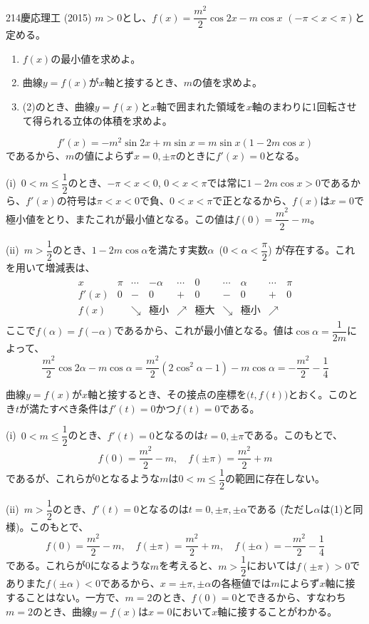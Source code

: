 \begin{prob}{214}{}{慶応理工 (2015)}
 $m>0$とし、$f(x)=\dfrac{m^2}{2}\cos 2x-m\cos x$ $(-\pi<x<\pi)$と定める。
 \begin{enumerate}
  \item $f(x)$の最小値を求めよ。
  \item 曲線$y=f(x)$が$x$軸と接するとき、$m$の値を求めよ。
  \item (2)のとき、曲線$y=f(x)$と$x$軸で囲まれた領域を$x$軸のまわりに1回転させて得られる立体の体積を求めよ。
 \end{enumerate}
\end{prob}
\[ f'(x)=-m^2\sin 2x+m\sin x=m\sin x(1-2m\cos x) \]
であるから、$m$の値によらず$x=0, \pm\pi$のときに$f'(x)=0$となる。

(i)~$0<m\le \dfrac{1}{2}$のとき、$-\pi<x<0$, $0<x<\pi$では常に$1-2m\cos x>0$であるから、$f'(x)$の符号は$\pi<x<0$で負、$0<x<\pi$で正となるから、$f(x)$は$x=0$で極小値をとり、またこれが最小値となる。この値は$f(0)=\dfrac{m^2}{2}-m$。

(ii)~$m>\dfrac{1}{2}$のとき、$1-2m\cos\alpha$を満たす実数$\alpha$~($0<\alpha<\dfrac{\pi}{2}$) が存在する。これを用いて増減表は、
\begin{align*}
 \begin{array}{c|c|c|c|c|c|c|c|c|c}
  x& \pi & \cdots & -\alpha & \cdots & 0 & \cdots & \alpha & \cdots & \pi \\ \hline
  f'(x) & 0 & - & 0 & + & 0 & - & 0 & + & 0 \\ \hline
  f(x) & & \searrow & \text{極小} & \nearrow & \text{極大} & \searrow & \text{極小} & \nearrow & 
 \end{array}
\end{align*}
ここで$f(\alpha)=f(-\alpha)$であるから、これが最小値となる。値は$\cos\alpha=\dfrac{1}{2m}$によって、
\[ \frac{m^2}{2}\cos 2\alpha-m\cos\alpha=\frac{m^2}{2}(2\cos^2\alpha-1)-m\cos\alpha=-\frac{m^2}{2}-\frac{1}{4} \]

曲線$y=f(x)$が$x$軸と接するとき、その接点の座標を$\bigl(t, f(t)\bigr)$とおく。このとき$t$が満たすべき条件は$f'(t)=0$かつ$f(t)=0$である。

(i)~$0<m\le \dfrac{1}{2}$のとき、$f'(t)=0$となるのは$t=0, \pm\pi$である。このもとで、
\[ f(0)=\frac{m^2}{2}-m,\quad f(\pm\pi)=\frac{m^2}{2}+m \]
であるが、これらが0となるような$m$は$0<m\le\dfrac{1}{2}$の範囲に存在しない。

(ii)~$m>\dfrac{1}{2}$のとき、$f'(t)=0$となるのは$t=0, \pm\pi, \pm\alpha$である (ただし$\alpha$は(1)と同様)。このもとで、
\[ f(0)=\frac{m^2}{2}-m,\quad f(\pm\pi)=\frac{m^2}{2}+m,\quad f(\pm\alpha)=-\frac{m^2}{2}-\frac{1}{4} \]
である。これらが0になるような$m$を考えると、$m>\dfrac{1}{2}$においては$f(\pm\pi)>0$でありまた$f(\pm\alpha)<0$であるから、$x=\pm\pi, \pm\alpha$の各極値では$m$によらず$x$軸に接することはない。一方で、$m=2$のとき、$f(0)=0$とできるから、すなわち$m=2$のとき、曲線$y=f(x)$は$x=0$において$x$軸に接することがわかる。

